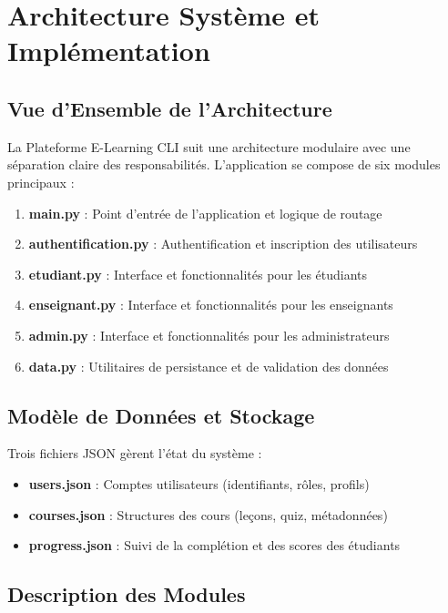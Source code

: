 \documentclass[12pt,a4paper]{article}
\begin{document}
\newpage

\section{Architecture Système et Implémentation}

\subsection{Vue d'Ensemble de l'Architecture}

La Plateforme E-Learning CLI suit une architecture modulaire avec une séparation claire des responsabilités. L'application se compose de six modules principaux :

\begin{enumerate}
    \item \textbf{main.py} : Point d'entrée de l'application et logique de routage
    \item \textbf{authentification.py} : Authentification et inscription des utilisateurs
    \item \textbf{etudiant.py} : Interface et fonctionnalités pour les étudiants
    \item \textbf{enseignant.py} : Interface et fonctionnalités pour les enseignants
    \item \textbf{admin.py} : Interface et fonctionnalités pour les administrateurs
    \item \textbf{data.py} : Utilitaires de persistance et de validation des données
\end{enumerate}

\subsection{Modèle de Données et Stockage}

Trois fichiers JSON gèrent l'état du système :

\begin{itemize}
    \item \textbf{users.json} : Comptes utilisateurs (identifiants, rôles, profils)
    \item \textbf{courses.json} : Structures des cours (leçons, quiz, métadonnées)
    \item \textbf{progress.json} : Suivi de la complétion et des scores des étudiants
\end{itemize}

\subsection{Description des Modules}
\end{document}
